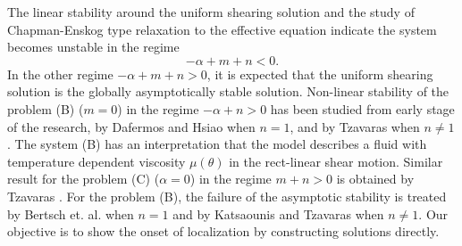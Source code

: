 \documentclass[graybox]{svmult}
\begin{document}
The linear stability around the uniform shearing solution \cite{FM87} and the study of Chapman-Enskog type relaxation to the effective equation \cite{KT09} indicate the system becomes unstable in the regime
\begin{equation}
 -\alpha + m + n < 0. \label{eq:constraint}
\end{equation}
In the other regime $-\alpha + m + n > 0$, it is expected that the uniform shearing solution is the globally asymptotically stable solution.
Non-linear stability of the problem (B) ($m=0$) in the regime $-\alpha+n>0$ has been studied from early stage of the research, by Dafermos and Hsiao \cite{dafermos_adiabatic_1983} when $n=1$, and by Tzavaras \cite{Tz_1986} when $n\ne1$. The system (B) has an interpretation that the model describes a fluid with temperature dependent viscosity $\mu(\theta)$ in the rect-linear shear motion. Similar result for the problem (C) ($\alpha=0$) in the regime $m+n>0$  is obtained by Tzavaras \cite{tzavaras_nonlinear_1992}. For the problem (B), the failure of the asymptotic stability is treated by Bertsch et. al. \cite{bertsch_effect_1991} when $n=1$ and by Katsaounis and Tzavaras \cite{KT09} when $n\ne1$. Our objective is to show the onset of localization by constructing solutions directly.
\end{document}
